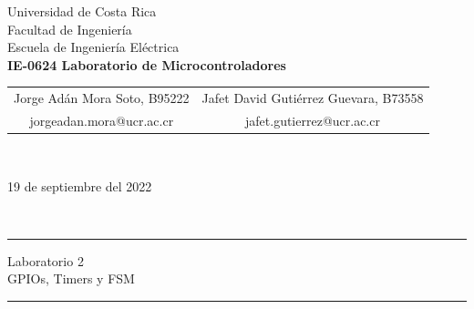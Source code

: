 \thispagestyle{empty}
\begin{center}
    \LARGE{\sc Universidad de Costa Rica}\\[-1mm]\Large{Facultad de Ingeniería}\\[-1mm]\Large{Escuela de Ingeniería} Eléctrica\\[2mm]\large{\textbf{IE-0624 Laboratorio de Microcontroladores}}
    \\[-0.10mm]
\begin{table}[H]
\centering
\begin{tabular}{cc}
Jorge Adán Mora Soto, B95222 & Jafet David Gutiérrez Guevara, B73558 \\
 \textcolor{ucrblue}{ \small{jorgeadan.mora@ucr.ac.cr}}    &  \textcolor{ucrblue}{ \small{jafet.gutierrez@ucr.ac.cr}}
\end{tabular}
\\[-6mm]
\end{table}
\large{19 de septiembre del 2022}
\end{center}


\\[-1.5cm]
\hrule
\begin{center}
\Large{Laboratorio 2}\\ \large{GPIOs, Timers y FSM}
\\[4mm]
\end{center}
\hrule
\vspace{8mm}